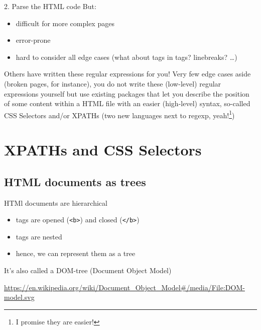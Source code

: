\begin{frame}{2. Parse the HTML code}
  But:
  \begin{itemize}
  \item difficult for more complex pages
  \item error-prone
  \item hard to consider all edge cases (what about tags in tags? linebreaks? \ldots)
  \end{itemize}

  \pause

  \begin{alertblock}{Others have written these regular expressions for you!}
Very few edge cases aside (broken pages, for instance), you do not write these (low-level) regular expressions yourself but use existing packages that let you describe the position of some content within a HTML file with an easier (high-level) syntax, so-called CSS Selectors and/or XPATHs (two new languages next to regexp, yeah!\footnote{I promise they are easier!})
\end{alertblock}


\end{frame}





\section{XPATHs and CSS Selectors}

\subsection{HTML documents as trees}

\begin{frame}{HTMl documents are hierarchical}
  \begin{itemize}
  \item tags are opened (\texttt{<b>}) and closed  (\texttt{</b>})
  \item tags are nested
  \item hence, we can represent them as a tree
  \end{itemize}
\footnotesize{It's also called a DOM-tree (Document Object Model)}
\end{frame}


\begin{frame}[plain]
  \tiny
  \url{https://en.wikipedia.org/wiki/Document_Object_Model#/media/File:DOM-model.svg}
\end{frame}


